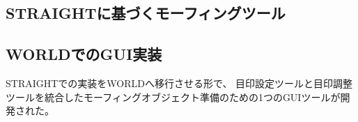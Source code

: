 \subsection{STRAIGHTに基づくモーフィングツール}


\subsection{WORLDでのGUI実装}
STRAIGHTでの実装をWORLDへ移行させる形で、
目印設定ツールと目印調整ツールを統合したモーフィングオブジェクト準備のための1つのGUIツールが開発された\cite{kawahara2024interactive}。
















